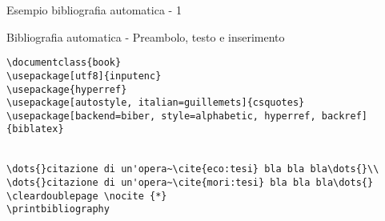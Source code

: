 \begin{frame}[fragile]{Esempio bibliografia automatica - 1}

\begin{exampleblock}{Bibliografia automatica - Preambolo, testo e inserimento}
	\begin{lstlisting}
\documentclass{book}
\usepackage[utf8]{inputenc}
\usepackage{hyperref}
\usepackage[autostyle, italian=guillemets]{csquotes}
\usepackage[backend=biber, style=alphabetic, hyperref, backref]{biblatex}


\dots{}citazione di un'opera~\cite{eco:tesi} bla bla bla\dots{}\\
\dots{}citazione di un'opera~\cite{mori:tesi} bla bla bla\dots{}
\cleardoublepage \nocite {*}
\printbibliography

	\end{lstlisting}
\end{exampleblock}

\end{frame}